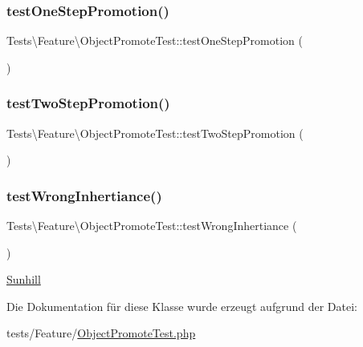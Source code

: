\subsubsection{\texorpdfstring{test\+One\+Step\+Promotion()}{testOneStepPromotion()}}
{\footnotesize\ttfamily Tests\textbackslash{}\+Feature\textbackslash{}\+Object\+Promote\+Test\+::test\+One\+Step\+Promotion (\begin{DoxyParamCaption}{ }\end{DoxyParamCaption})}

\mbox{\label{classTests_1_1Feature_1_1ObjectPromoteTest_a2b77973fe2b8b680985513ff1b518fa5}} 
\subsubsection{\texorpdfstring{test\+Two\+Step\+Promotion()}{testTwoStepPromotion()}}
{\footnotesize\ttfamily Tests\textbackslash{}\+Feature\textbackslash{}\+Object\+Promote\+Test\+::test\+Two\+Step\+Promotion (\begin{DoxyParamCaption}{ }\end{DoxyParamCaption})}

\mbox{\label{classTests_1_1Feature_1_1ObjectPromoteTest_a1aab5886a73b852bed1bc005012c245c}} 
\subsubsection{\texorpdfstring{test\+Wrong\+Inhertiance()}{testWrongInhertiance()}}
{\footnotesize\ttfamily Tests\textbackslash{}\+Feature\textbackslash{}\+Object\+Promote\+Test\+::test\+Wrong\+Inhertiance (\begin{DoxyParamCaption}{ }\end{DoxyParamCaption})}

\hyperlink{namespaceSunhill}{Sunhill} 

Die Dokumentation für diese Klasse wurde erzeugt aufgrund der Datei\+:\begin{DoxyCompactItemize}
\item 
tests/\+Feature/\hyperlink{ObjectPromoteTest_8php}{Object\+Promote\+Test.\+php}\end{DoxyCompactItemize}
